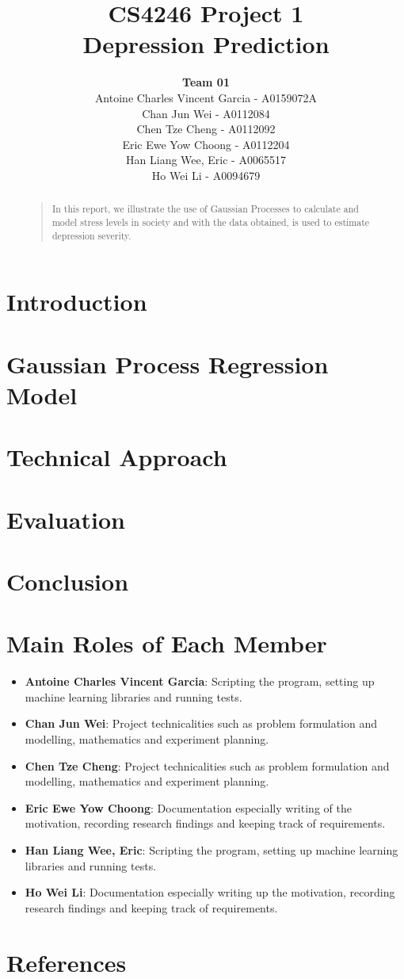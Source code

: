 \documentclass{article}
\title{
	CS4246 Project 1\\ Depression Prediction
}
\author{
	{\bf Team 01} \\
	Antoine Charles Vincent Garcia - A0159072A\\
	Chan Jun Wei - A0112084\\
	Chen Tze Cheng - A0112092\\
	Eric Ewe Yow Choong - A0112204\\
	Han Liang Wee, Eric - A0065517\\
	Ho Wei Li - A0094679\\
}
\begin{document}
 	\maketitle

	\begin{abstract}
	\begin{quote}
	In this report, we illustrate the use of Gaussian Processes to calculate and model stress levels in society and with the data obtained, is used to estimate depression severity.
	\end{quote}
	\end{abstract}
	
	\section{Introduction}

	\section{Gaussian Process Regression Model}

	\section{Technical Approach}

	\section{Evaluation}

	\section{Conclusion}	

	\section{Main Roles of Each Member}
	\begin{itemize}
		\item \textbf{Antoine Charles Vincent Garcia}: 
		Scripting the program, setting up machine learning libraries and running tests.
		\item \textbf{Chan Jun Wei}: 
		Project technicalities such as problem formulation and modelling, mathematics and experiment planning.
		\item \textbf{Chen Tze Cheng}: 
		Project technicalities such as problem formulation and modelling, mathematics and experiment planning.
		\item \textbf{Eric Ewe Yow Choong}: 
		Documentation especially writing of the motivation, recording research findings and keeping track of requirements.
		\item \textbf{Han Liang Wee, Eric}: 
		Scripting the program, setting up machine learning libraries and running tests.
		\item \textbf{Ho Wei Li}: 
		Documentation especially writing up the motivation, recording research findings and keeping track of requirements.
	\end{itemize}
	
	\section{References}
\end{document}

